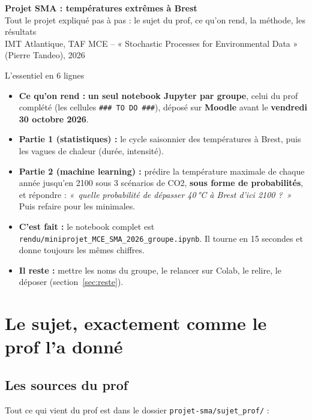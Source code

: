 \documentclass[11pt,a4paper]{article}
\newcommand{\f}[1]{\texttt{#1}}
\newcommand{\en}[1]{\textit{«~#1~»}}
\begin{document}
\begin{center}
{\LARGE\bfseries Projet SMA : températures extrêmes à Brest}\\[4pt]
{\large Tout le projet expliqué pas à pas : le sujet du prof, ce qu'on rend, la méthode, les résultats}\\[4pt]
{\small\color{gris} IMT Atlantique, TAF MCE -- « Stochastic Processes for Environmental Data » (Pierre Tandeo), 2026}
\end{center}

\begin{cadre}{L'essentiel en 6 lignes}
\begin{itemize}
  \item \textbf{Ce qu'on rend :} \textbf{un seul notebook Jupyter par groupe}, celui du prof complété (les cellules \f{\#\#\# TO DO \#\#\#}), déposé sur \textbf{Moodle} avant le \textbf{vendredi 30 octobre 2026}.
  \item \textbf{Partie 1 (statistiques) :} le cycle saisonnier des températures à Brest, puis les vagues de chaleur (durée, intensité).
  \item \textbf{Partie 2 (machine learning) :} prédire la température maximale de chaque année jusqu'en 2100 sous 3 scénarios de CO2, \textbf{sous forme de probabilités}, et répondre : \en{quelle probabilité de dépasser 40\,°C à Brest d'ici 2100 ?} Puis refaire pour les minimales.
  \item \textbf{C'est fait :} le notebook complet est \f{rendu/miniprojet\_MCE\_SMA\_2026\_groupe.ipynb}. Il tourne en 15 secondes et donne toujours les mêmes chiffres.
  \item \textbf{Il reste :} mettre les noms du groupe, le relancer sur Colab, le relire, le déposer (section~\ref{sec:reste}).
\end{itemize}
\end{cadre}

{\setcounter{tocdepth}{1}\tableofcontents}
\newpage

\section{Le sujet, exactement comme le prof l'a donné}

\subsection{Les sources du prof}

Tout ce qui vient du prof est dans le dossier \f{projet-sma/sujet\_prof/} :
\end{document}
